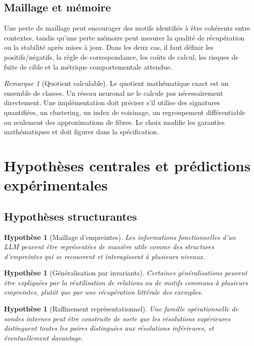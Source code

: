 \documentclass[11pt,a4paper]{article}
\newtheorem{hypothesis}[definition]{Hypothèse}
\theoremstyle{remark}
\newtheorem{remark}[definition]{Remarque}
\newcommand{\1}{\mathbf 1}
\begin{document}
\subsection{Maillage et mémoire}
Une perte de maillage peut encourager des motifs identifiés à être cohérents entre contextes, tandis qu'une perte mémoire peut mesurer la qualité de récupération ou la stabilité après mises à jour. Dans les deux cas, il faut définir les positifs/négatifs, la règle de correspondance, les coûts de calcul, les risques de fuite de cible et la métrique comportementale attendue.

\begin{remark}[Quotient calculable]
Le quotient mathématique exact est un ensemble de classes. Un réseau neuronal ne le calcule pas nécessairement directement. Une implémentation doit préciser s'il utilise des signatures quantifiées, un clustering, un index de voisinage, un regroupement différentiable ou seulement des approximations de fibres. Le choix modifie les garanties mathématiques et doit figurer dans la spécification.
\end{remark}

\section{Hypothèses centrales et prédictions expérimentales}

\subsection{Hypothèses structurantes}
\begin{hypothesis}[Maillage d'empreintes]
Les informations fonctionnelles d'un LLM peuvent être représentées de manière utile comme des structures d'empreintes qui se recouvrent et interagissent à plusieurs niveaux.
\end{hypothesis}

\begin{hypothesis}[Généralisation par invariants]
Certaines généralisations peuvent être expliquées par la réutilisation de relations ou de motifs communs à plusieurs empreintes, plutôt que par une récupération littérale des exemples.
\end{hypothesis}

\begin{hypothesis}[Raffinement représentationnel]
Une famille opérationnelle de sondes internes peut être construite de sorte que les résolutions supérieures distinguent toutes les paires distinguées aux résolutions inférieures, et éventuellement davantage.
\end{hypothesis}
\end{document}
